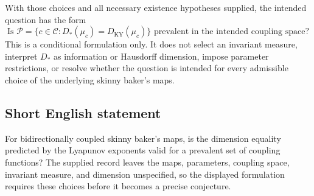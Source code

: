 \documentclass[11pt]{article}
\begin{document}
With those choices and all necessary existence hypotheses supplied, the intended question has the form
\[
\text{Is }\mathcal P=\{c\in\mathcal C:
D_*(\mu_c)=D_{\mathrm{KY}}(\mu_c)\}
\text{ prevalent in the intended coupling space?}
\]
This is a conditional formulation only. It does not select an invariant measure, interpret \(D_*\) as information or Hausdorff dimension, impose parameter restrictions, or resolve whether the question is intended for every admissible choice of the underlying skinny baker's maps.
\subsection{Short English statement}
For bidirectionally coupled skinny baker's maps, is the dimension equality predicted by the Lyapunov exponents valid for a prevalent set of coupling functions? The supplied record leaves the maps, parameters, coupling space, invariant measure, and dimension unspecified, so the displayed formulation requires these choices before it becomes a precise conjecture.
\end{document}

